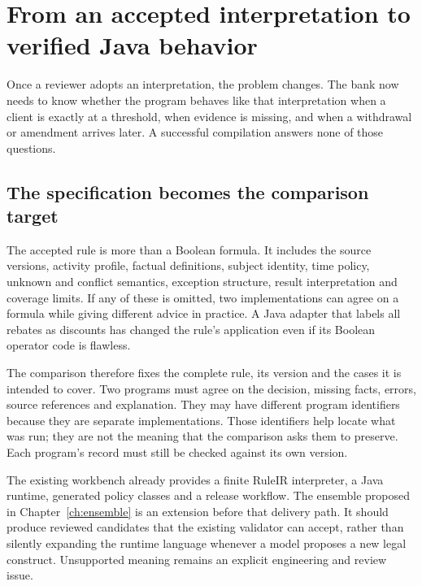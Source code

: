 \chapter{From an accepted interpretation to verified Java behavior}
\label{ch:verification}

Once a reviewer adopts an interpretation, the problem changes. The bank now
needs to know whether the program behaves like that interpretation when a client
is exactly at a threshold, when evidence is missing, and when a withdrawal or
amendment arrives later. A successful compilation answers none of those
questions.

\section{The specification becomes the comparison target}
\label{merge:M07:00}


The accepted rule is more than a Boolean formula. It includes the source
versions, activity profile, factual definitions, subject identity, time policy,
unknown and conflict semantics, exception structure, result interpretation and
coverage limits. If any of these is omitted, two implementations can agree on a
formula while giving different advice in practice. A Java adapter that labels
all rebates as discounts has changed the rule's application even if its Boolean
operator code is flawless.


The comparison therefore fixes the complete rule, its version and the cases it
is intended to cover. Two programs must agree on the decision, missing facts,
errors, source references and explanation. They may have different program
identifiers because they are separate implementations. Those identifiers help
locate what was run; they are not the meaning that the comparison asks them to
preserve. Each program's record must still be checked against its own version.

The existing workbench already provides a finite RuleIR interpreter, a Java
runtime, generated policy classes and a release workflow. The ensemble proposed
in Chapter~\ref{ch:ensemble} is an extension before that delivery path. It should
produce reviewed candidates that the existing validator can accept, rather than
silently expanding the runtime language whenever a model proposes a new legal
construct. Unsupported meaning remains an explicit engineering and review issue.

